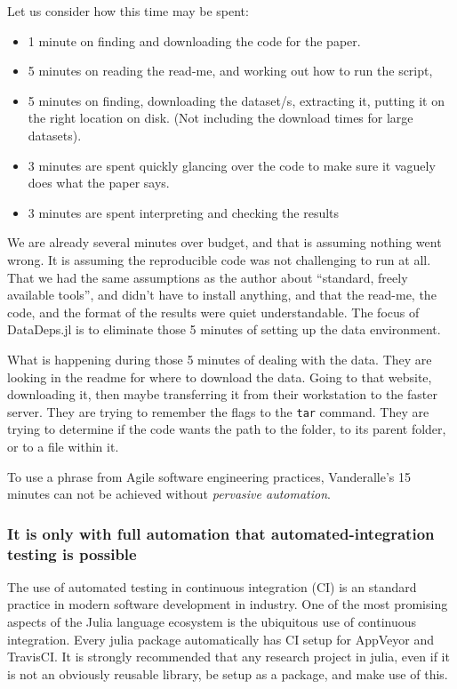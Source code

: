 \documentclass{jors}
\begin{document}
Let us consider how this time may be spent:
\begin{itemize}
	\item 1 minute on finding and downloading the code for the paper.
	\item 5 minutes on reading the read-me, and working out how to run the script,
	\item 5 minutes on finding, downloading the dataset/s, extracting it, putting it on the right location on disk. (Not including the download times for large datasets).
	\item 3 minutes are spent quickly glancing over the code to make sure it vaguely does what the paper says.
	\item 3 minutes are spent interpreting and checking the results
\end{itemize}
We are already several minutes over budget, and that is assuming nothing went wrong.
It is assuming the reproducible code was not challenging to run at all.
That we had the same assumptions as the author about ``standard, freely available tools'', and didn't have to install anything,
and that the read-me, the code, and the format of the results were quiet understandable.
The focus of DataDeps.jl is to eliminate those 5 minutes of setting up the data environment.

What is happening during those 5 minutes of dealing with the data.
They are looking in the readme for where to download the data.
Going to that website, downloading it, then maybe transferring it from their workstation to the faster server.
They are trying to remember the flags to the \texttt{tar} command.
They are trying to determine if the code wants the path to the folder, to its parent folder, or to a file within it.

To use a phrase from Agile software engineering practices, Vanderalle's 15 minutes can not be achieved without \emph{pervasive automation}.

\subsubsection{It is only with full automation that automated-integration testing is possible}
The use of automated testing in continuous integration (CI) is an standard practice in modern software development in industry.
One of the most promising aspects of the Julia language ecosystem is the ubiquitous use of continuous integration.
Every julia package automatically has CI setup for AppVeyor and TravisCI.
It is strongly recommended that any research project in julia, even if it is not an obviously reusable library, be setup as a package, and make use of this.
\end{document}
